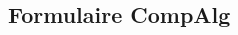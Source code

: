\documentclass[10pt,a4paper,landscape]{article}
\begin{document}
\begin{multicols*}{3}
    \section*{Formulaire CompAlg}
    
    \newpage
    
    \newpage
    
    \columnbreak
    
    
    
    



\end{multicols*}
\end{document}
